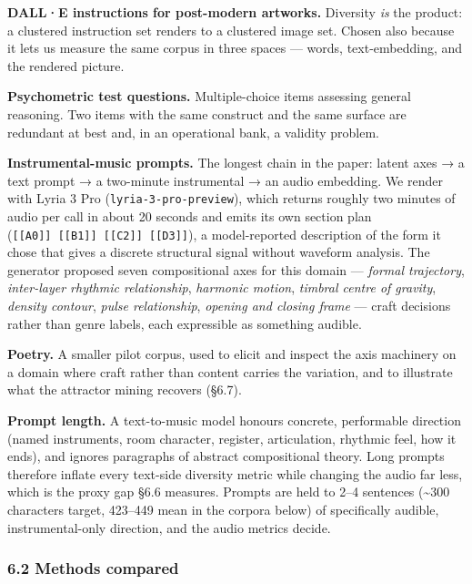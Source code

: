 \documentclass[
  11pt,
]{article}
\theoremstyle{plain}
\theoremstyle{definition}
\begin{document}
\textbf{DALL·E instructions for post-modern artworks.} Diversity
\emph{is} the product: a clustered instruction set renders to a
clustered image set. Chosen also because it lets us measure the same
corpus in three spaces --- words, text-embedding, and the rendered
picture.

\textbf{Psychometric test questions.} Multiple-choice items assessing
general reasoning. Two items with the same construct and the same
surface are redundant at best and, in an operational bank, a validity
problem.

\textbf{Instrumental-music prompts.} The longest chain in the paper:
latent axes → a text prompt → a two-minute instrumental → an audio
embedding. We render with Lyria 3 Pro (\texttt{lyria-3-pro-preview}),
which returns roughly two minutes of audio per call in about 20 seconds
and emits its own section plan
(\texttt{{[}{[}A0{]}{]}\ {[}{[}B1{]}{]}\ {[}{[}C2{]}{]}\ {[}{[}D3{]}{]}}),
a model-reported description of the form it chose that gives a discrete
structural signal without waveform analysis. The generator proposed
seven compositional axes for this domain --- \emph{formal trajectory},
\emph{inter-layer rhythmic relationship}, \emph{harmonic motion},
\emph{timbral centre of gravity}, \emph{density contour}, \emph{pulse
relationship}, \emph{opening and closing frame} --- craft decisions
rather than genre labels, each expressible as something audible.

\textbf{Poetry.} A smaller pilot corpus, used to elicit and inspect the
axis machinery on a domain where craft rather than content carries the
variation, and to illustrate what the attractor mining recovers (§6.7).

\textbf{Prompt length.} A text-to-music model honours concrete,
performable direction (named instruments, room character, register,
articulation, rhythmic feel, how it ends), and ignores paragraphs of
abstract compositional theory. Long prompts therefore inflate every
text-side diversity metric while changing the audio far less, which is
the proxy gap §6.6 measures. Prompts are held to 2--4 sentences
(\textasciitilde300 characters target, 423--449 mean in the corpora
below) of specifically audible, instrumental-only direction, and the
audio metrics decide.

\subsubsection{6.2 Methods compared}\label{62-methods-compared}
\end{document}
